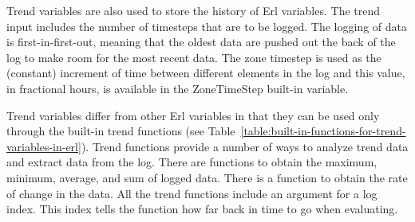 Trend variables are also used to store the history of Erl variables. The trend input includes the number of timesteps that are to be logged. The logging of data is first-in-first-out, meaning that the oldest data are pushed out the back of the log to make room for the most recent data. The zone timestep is used as the (constant) increment of time between different elements in the log and this value, in fractional hours, is available in the ZoneTimeStep built-in variable.

Trend variables differ from other Erl variables in that they can be used only through the built-in trend functions (see Table~\ref{table:built-in-functions-for-trend-variables-in-erl}). Trend functions provide a number of ways to analyze trend data and extract data from the log. There are functions to obtain the maximum, minimum, average, and sum of logged data. There is a function to obtain the rate of change in the data. All the trend functions include an argument for a log index. This index tells the function how far back in time to go when evaluating.
